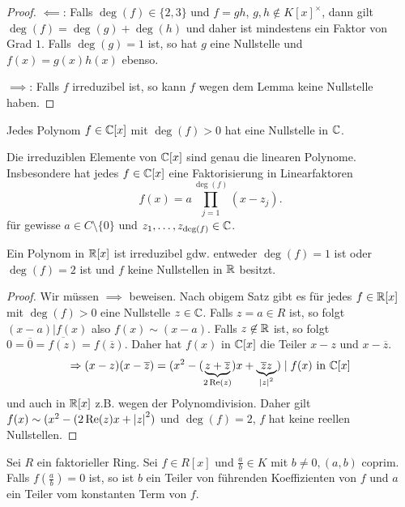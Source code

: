 \begin{proof}
	$\impliedby$: Falls $\deg(f) \in \{2,3\}$ und $f = g h$, $g,h \not\in K[x]^{\times}$,
	dann gilt $\deg(f) = \deg(g) + \deg(h)$ und daher ist mindestens ein Faktor von Grad $1$.  
	Falls $\deg(g) = 1$ ist, so hat $g$ eine Nullstelle und $f(x) = g(x) h(x)$ ebenso.

	$\implies$: Falls $f$ irreduzibel ist, so kann $f$ wegen dem Lemma keine Nullstelle haben.
\end{proof}

\begin{theorem}
	Jedes Polynom $f \in \mathbb{C}[x]$ mit $\deg(f) > 0$ hat eine Nullstelle in $\mathbb{C}$.

	Die irreduziblen Elemente von $\mathbb{C}[x]$ sind genau die linearen Polynome.
	Insbesondere hat jedes $f \in \mathbb{C}[x]$ eine Faktorisierung in Linearfaktoren
	\[
		f(x) = a \prod_{j=1}^{\deg(f)} (x-z_{j})
	.\] 
	für gewisse $a \in C \setminus \{0\}$ und $z_1,\ldots,z_{\deg(f)} \in \mathbb{C}$.
\end{theorem}

\begin{corollary}
	Ein Polynom in $\mathbb{R}[x]$ ist irreduzibel gdw. entweder $\deg(f) = 1$ ist oder $\deg(f) = 2$ ist und $f$ keine Nullstellen in $\mathbb{R}$ besitzt.
\end{corollary}

\begin{proof}
	Wir müssen $\implies$ beweisen. Nach obigem Satz gibt es für jedes $f \in \mathbb{R}[x]$ mit $\deg(f) > 0$ eine Nullstelle $z \in \mathbb{C}$.
	Falls $z = a \in R$ ist, so folgt $(x-a) | f(x)$ also $f(x) \sim (x-a)$.
	Falls $z \not\in \mathbb{R}$ ist, so folgt $0 = \overline{0} = \overline{f(z)} = f(\overline{z})$.
	Daher hat $f(x)$ in $\mathbb{C}[x]$ die Teiler $x-z$ und $x-\overline{z}$.
	\[
		\Rightarrow (x-z)(x-\overline{z}) = (x^2 - (\underbrace{z+\overline{z}}_{2 \Re(z)}) x + \underbrace{\overline{z}z}_{\abs{z}^2}) \mid f(x) \text{ in } \mathbb{C}[x]
	\] 
	und auch in $\mathbb{R}[x]$ z.B. wegen der Polynomdivision.
	Daher gilt $f(x) \sim (x^2 - (2\Re(z)x + \abs{z}^2)$ und $\deg(f) = 2$, $f$ hat keine reellen Nullstellen.
\end{proof}

\begin{proposition}
	Sei $R$ ein faktorieller Ring. Sei $f \in R[x]$ und $\frac{a}{b} \in K$ mit $b \neq 0, (a,b)$ coprim.
	Falls $f(\frac{a}{b}) = 0$ ist, so ist $b$ ein Teiler von führenden Koeffizienten von $f$ und $a$ ein Teiler vom konstanten Term von $f$.
\end{proposition}

